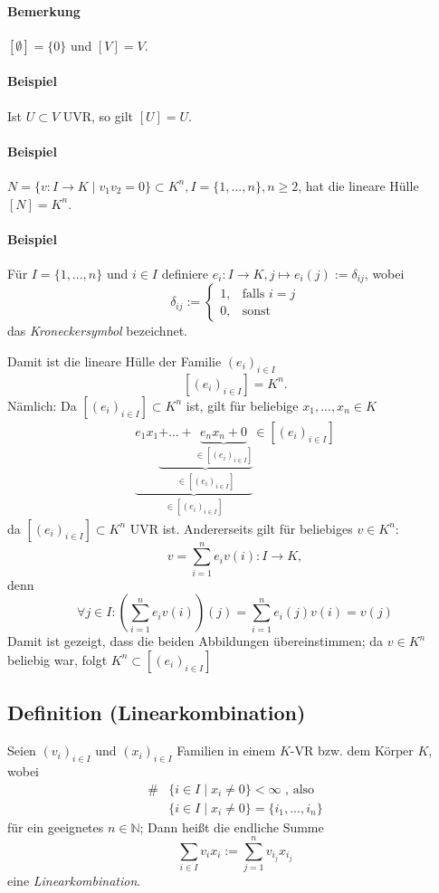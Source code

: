 \paragraph{Bemerkung}
	$[\emptyset ] = \{0\}$ und $[V] = V$.

\paragraph{Beispiel}
	Ist $U\subset V$ UVR, so gilt $[U] = U$.

\paragraph{Beispiel}
	$N=\{v:I\to K\mid v_1v_2=0\} \subset K^n,I=\{1,...,n\},n\geq 2$, hat die lineare Hülle $[N]=K^n$.

\paragraph{Beispiel}
	Für $I=\{1,...,n\}$ und $i\in I$ definiere
	$e_i:I\to K , j\mapsto e_i(j):= \delta_{ij}$, wobei 
	\begin{equation*}
		\delta_{ij} :=
		\begin{cases}
			1,& \text{falls }i=j\\
			0,& \text{sonst}
		\end{cases}
	\end{equation*}
	das \emph{Kroneckersymbol} bezeichnet.
	
	Damit ist die lineare Hülle der Familie $(e_i)_{i\in I}$
		\[ [(e_i)_{i\in I}] = K^n. \]
	Nämlich: Da $[(e_i)_{i\in I}]\subset K^n$ ist, gilt für beliebige $x_1,...,x_n\in K$
	\begin{gather*}
		\underbrace{e_1x_1\underbrace{+...+\underbrace{e_nx_n + 0}_{\in [(e_i)_{i\in I}]}}_{\in [(e_i)_{i\in I}]}}_{\in [(e_i)_{i\in I}]}\in [(e_i)_{i\in I}]
	\end{gather*}
	da $[(e_i)_{i\in I}] \subset K^n$ UVR ist. 
	Andererseits gilt für beliebiges $v\in K^n$:
		\[ v=\sum^n_{i=1}e_iv(i): I\to K, \]	
	denn
		\[ \forall j\in I: \left(\sum^n_{i=1} e_iv(i)\right)(j) = \sum^n_{i=1}e_i(j)v(i) = v(j) \]
	Damit ist gezeigt, dass die beiden Abbildungen übereinstimmen; da $v\in K^n$ beliebig war, folgt $K^n \subset [(e_i)_{i\in I}]$
	
\subsection{Definition (Linearkombination)}
	\begin{Definition}
		Seien $(v_i)_{i\in I}$ und $(x_i)_{i\in I}$ Familien in einem $ K $-VR bzw. dem Körper $ K $, wobei
	\begin{align*}
		\# &\{i\in I\mid x_i \neq 0\} < \infty\text{ , also}\\
		   &\{i\in I \mid x_i \neq 0\} = \{i_1,...,i_n\}
        \end{align*}
        für ein geeignetes  $n\in \mathbb{N}$;
    	Dann heißt die endliche Summe
            \[\sum_{i\in I} v_ix_i:= \sum^n_{j=1}v_{i_j}x_{i_j}\]
        eine \emph{Linearkombination}.
	\end{Definition}
	
